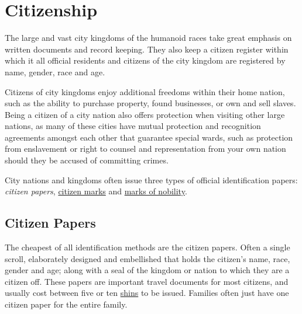 \section{Citizenship}
\label{sec:Citizenship}

The large and vast city kingdoms of the humanoid races take great emphasis
on written documents and record keeping. They also keep a citizen register
within which it all official residents and citizens of the city kingdom are
registered by name, gender, race and age.

Citizens of city kingdoms enjoy additional freedoms within their home nation,
such as the ability to purchase property, found businesses, or own and sell
slaves. Being a citizen of a city nation also offers protection when visiting
other large nations, as many of these cities have mutual protection and
recognition agreements amongst each other that guarantee special wards, such
as protection from enslavement or right to counsel and representation from your
own nation should they be accused of committing crimes.

City nations and kingdoms often issue three types of official identification
papers: \emph{citizen papers}, \hyperref[sec:Citizen Mark]{citizen marks} and
\hyperref[sec:Nobility Mark]{marks of nobility}.

\subsection{Citizen Papers}
\label{sec:Citizen Papers}

The cheapest of all identification methods are the citizen papers. Often a
single scroll, elaborately designed and embellished that holds the citizen's
name, race, gender and age; along with a seal of the kingdom or nation to
which they are a citizen off. These papers are important travel documents for
most citizens, and usually cost between five or ten \hyperref[sec:Shin]{shins}
to be issued. Families often just have one citizen paper for the entire family.
